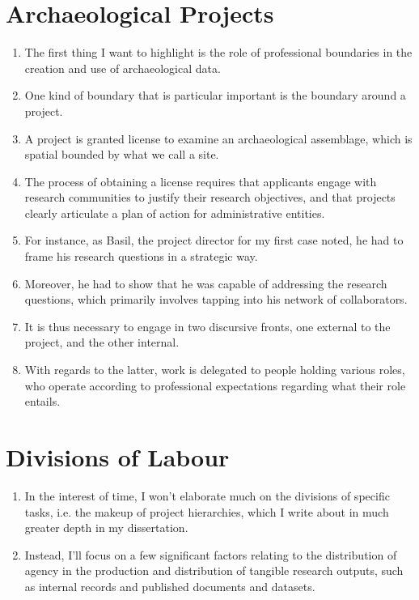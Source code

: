 \documentclass{article}
\begin{document}
\section{Archaeological Projects}
\begin{enumerate}
  \item The first thing I want to highlight is the role of professional boundaries in the creation and use of archaeological data.
  \item One kind of boundary that is particular important is the boundary around a project.
  \item A project is granted license to examine an archaeological assemblage, which is spatial bounded by what we call a site.
  \item The process of obtaining a license requires that applicants engage with research communities to justify their research objectives, and that projects clearly articulate a plan of action for administrative entities.
  \item For instance, as Basil, the project director for my first case noted, he had to frame his research questions in a strategic way.
  \item Moreover, he had to show that he was capable of addressing the research questions, which primarily involves tapping into his network of collaborators.
  \item It is thus necessary to engage in two discursive fronts, one external to the project, and the other internal.
  \item With regards to the latter, work is delegated to people holding various roles, who operate according to professional expectations regarding what their role entails.

\end{enumerate}

\section{Divisions of Labour}
\begin{enumerate}
  \item In the interest of time, I won't elaborate much on the divisions of specific tasks, i.e. the makeup of project hierarchies, which I write about in much greater depth in my dissertation.
  \item Instead, I'll focus on a few significant factors relating to the distribution of agency in the production and distribution of tangible research outputs, such as internal records and published documents and datasets.
\end{enumerate}
  
\end{document}
